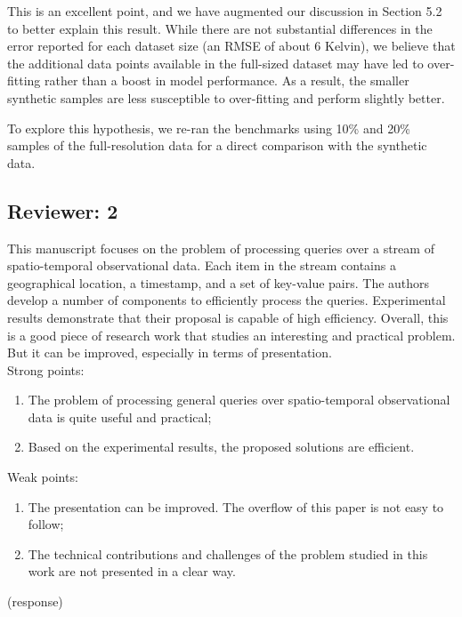 \documentclass{article}
\begin{document}
\begin{tcolorbox}
This is an excellent point, and we have augmented our discussion in Section 5.2 to better explain this result. While there are not substantial differences in the error reported for each dataset size (an RMSE of about 6 Kelvin), we believe that the additional data points available in the full-sized dataset may have led to over-fitting rather than a boost in model performance. As a result, the smaller synthetic samples are less susceptible to over-fitting and perform slightly better.

To explore this hypothesis, we re-ran the benchmarks using 10\% and 20\% samples of the full-resolution data for a direct comparison with the synthetic data. %
\end{tcolorbox}

\subsection*{Reviewer: 2}\label{reviewer-2}
This manuscript focuses on the problem of processing queries over a stream of spatio-temporal observational data. Each item in the stream contains a geographical location, a timestamp, and a set of key-value pairs. The authors develop a number of components to efficiently process the queries. Experimental results demonstrate that their proposal is capable of high efficiency. Overall, this is a good piece of research work that studies an interesting and practical problem. But it can be improved, especially in terms of presentation. \\
%
Strong points:
\begin{enumerate}
    \item The problem of processing general queries over spatio-temporal observational data is quite useful and practical;
    \item Based on the experimental results, the proposed solutions are efficient.
\end{enumerate}
%
Weak points:
\begin{enumerate}
    \item The presentation can be improved. The overflow of this paper is not easy to follow;
    \item The technical contributions and challenges of the problem studied in this work are not presented in a clear way.
\end{enumerate}

\begin{tcolorbox}
(response)
\end{tcolorbox}
\end{document}
